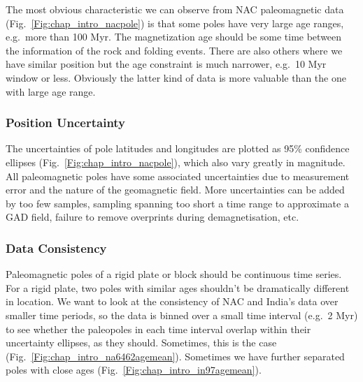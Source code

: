 The most obvious characteristic we can observe from NAC paleomagnetic data
(Fig.~\ref{Fig:chap_intro_nacpole}) is that some poles have very large age
ranges, e.g.\ more than 100 Myr. The magnetization age should be some time
between the information of the rock and folding events. There are also others
where we have similar position but the age constraint is much narrower, e.g.\ 10
Myr window or less. Obviously the latter kind of data is more valuable than the
one with large age range.

\subsubsection{Position Uncertainty}\label{sec:posu}

The uncertainties of pole latitudes and longitudes are plotted as 95\%
confidence ellipses (Fig.~\ref{Fig:chap_intro_nacpole}), which also vary greatly
in magnitude. All paleomagnetic poles have some associated uncertainties due to
measurement error and the nature of the geomagnetic field. More uncertainties
can be added by too few samples, sampling spanning too short a time range to
approximate a GAD field, failure to remove overprints during demagnetisation,
etc.

\subsubsection{Data Consistency}\label{sec:datcons}

Paleomagnetic poles of a rigid plate or block should be continuous time series.
For a rigid plate, two poles with similar ages shouldn't be dramatically
different in location. We want to look at the consistency of NAC and India's
data over smaller time periods, so the data is binned over a small time interval
(e.g.\ 2 Myr) to see whether the paleopoles in each time interval overlap within
their uncertainty ellipses, as they should. Sometimes, this is the case
(Fig.~\ref{Fig:chap_intro_na6462agemean}). Sometimes we have further separated
poles with close ages (Fig.~\ref{Fig:chap_intro_in97agemean}).

